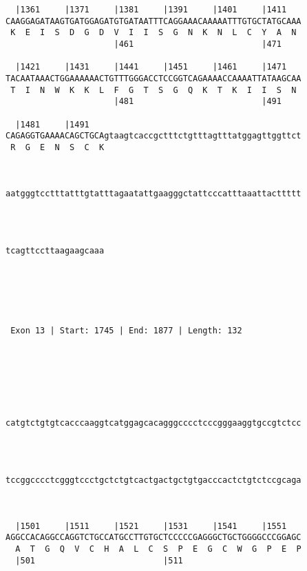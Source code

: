 \documentclass{article}
\begin{document}
\begin{Verbatim}
  |1361     |1371     |1381     |1391     |1401     |1411   
CAAGGAGATAAGTGATGGAGATGTGATAATTTCAGGAAACAAAAATTTGTGCTATGCAAA
 K  E  I  S  D  G  D  V  I  I  S  G  N  K  N  L  C  Y  A  N 
                      |461                          |471    
   
  |1421     |1431     |1441     |1451     |1461     |1471   
TACAATAAACTGGAAAAAACTGTTTGGGACCTCCGGTCAGAAAACCAAAATTATAAGCAA
 T  I  N  W  K  K  L  F  G  T  S  G  Q  K  T  K  I  I  S  N 
                      |481                          |491    
   
  |1481     |1491                                           
CAGAGGTGAAAACAGCTGCAgtaagtcaccgctttctgtttagtttatggagttggttct
 R  G  E  N  S  C  K                                        
                                                            
   
                                                            
aatgggtcctttatttgtatttagaatattgaagggctattcccatttaaattacttttt
                                                            
                                                            
   
                    
tcagttccttaagaagcaaa
                    
                    
  



 Exon 13 | Start: 1745 | End: 1877 | Length: 132 





   
                                                            
catgtctgtgtcacccaaggtcatggagcacagggcccctcccgggaaggtgccgtctcc
                                                            
                                                            
   
                                                            
tccggcccctcgggtccctgctctgtcactgactgctgtgacccactctgtctccgcaga
                                                            
                                                            
   
  |1501     |1511     |1521     |1531     |1541     |1551   
AGGCCACAGGCCAGGTCTGCCATGCCTTGTGCTCCCCCGAGGGCTGCTGGGGCCCGGAGC
  A  T  G  Q  V  C  H  A  L  C  S  P  E  G  C  W  G  P  E  P
  |501                          |511                        
   

\end{Verbatim}
\end{document}
